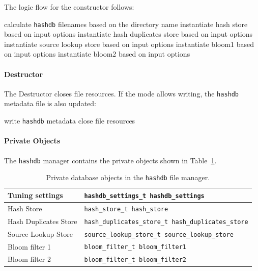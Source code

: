 \documentclass[10pt,twoside]{article}
\newcommand{\hdb}{\texttt{hashdb}\xspace}
\begin{document}
The logic flow for the constructor follows:
\begin{algorithmic}
\STATE calculate \hdb filenames based on the directory name
\STATE instantiate hash store based on input options
\STATE instantiate hash duplicates store based on input options
\STATE instantiate source lookup store based on input options
  \STATE instantiate bloom1 based on input options
\ENDIF
{}
  \STATE instantiate bloom2 based on input options
\ENDIF
\end{algorithmic}

\paragraph{Destructor}
The Destructor closes file resources.
If the mode allows writing, the \hdb metadata file is also updated:
\begin{algorithmic}
  \STATE write \hdb metadata
\ENDIF
\STATE close file resources
\end{algorithmic}

\paragraph{Private Objects}
The \hdb manager contains the private objects
shown in Table~\ref{hashdb-objects}.
\begin{table}[h]
\center
\begin{tabular}{|p{2in}|p{4in}|}
\hline
Tuning settings & \texttt{hashdb\_settings\_t hashdb\_settings} \\
\hline
Hash Store & \texttt{hash\_store\_t hash\_store} \\
\hline
Hash Duplicates Store & \texttt{hash\_duplicates\_store\_t hash\_duplicates\_store} \\
\hline
Source Lookup Store & \texttt{source\_lookup\_store\_t source\_lookup\_store} \\
\hline
Bloom filter 1 & \texttt{bloom\_filter\_t bloom\_filter1} \\
\hline
Bloom filter 2 & \texttt{bloom\_filter\_t bloom\_filter2} \\
\hline
\end{tabular}
\caption{Private database objects in the \hdb file manager.\label{hashdb-objects}}
\end{table}
\end{document}
